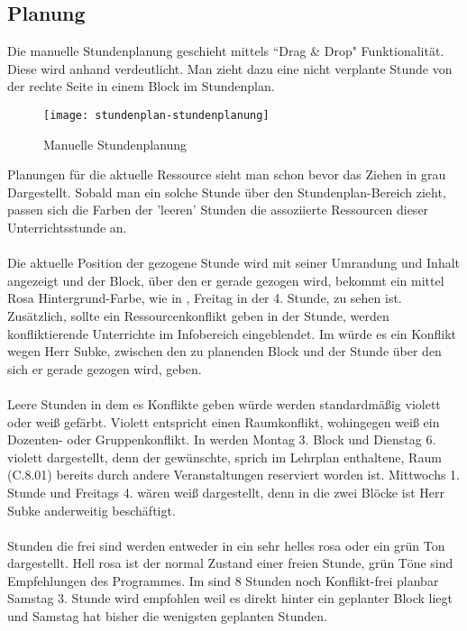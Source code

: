 \subsection{Planung}
\label{sec:manuelle-planung}

Die manuelle Stundenplanung geschieht mittels ``Drag \& Drop" Funktionalität. Diese wird anhand  verdeutlicht. Man zieht dazu eine nicht verplante Stunde von der rechte Seite in einem Block im Stundenplan.\\

\begin{figure}[h]
	\centering
	\texttt{[image: stundenplan-stundenplanung]}
	\vspace{-5pt}
	\caption{Manuelle Stundenplanung}
	\label{fig:stundenplan-stundenplanung}
\end{figure}

\noindent
Planungen für die aktuelle Ressource sieht man schon bevor das Ziehen in grau Dargestellt. Sobald man ein solche Stunde über den Stundenplan-Bereich zieht, passen sich die Farben der 'leeren' Stunden die assoziierte Ressourcen dieser Unterrichtsstunde an.\\
\\
Die aktuelle Position der gezogene Stunde wird mit seiner Umrandung und Inhalt angezeigt und der Block, über den er gerade gezogen wird, bekommt ein mittel Rosa Hintergrund-Farbe, wie in , Freitag in der 4. Stunde, zu sehen ist. Zusätzlich, sollte ein Ressourcenkonflikt geben in der Stunde, werden konfliktierende Unterrichte im Infobereich eingeblendet. Im  würde es ein Konflikt wegen Herr Subke, zwischen den zu planenden Block und der Stunde über den sich er gerade gezogen wird, geben.\\
\\
Leere Stunden in dem es Konflikte geben würde werden standardmäßig violett oder weiß gefärbt. Violett entspricht einen Raumkonflikt, wohingegen weiß ein Dozenten- oder Gruppenkonflikt. In  werden Montag 3. Block und Dienstag 6. violett dargestellt, denn der gewünschte, sprich im Lehrplan enthaltene, Raum (C.8.01) bereits durch andere Veranstaltungen reserviert worden ist. Mittwochs 1. Stunde und Freitags 4. wären weiß dargestellt, denn in die zwei Blöcke ist Herr Subke anderweitig beschäftigt.\\
\\
Stunden die frei sind werden entweder in ein sehr helles rosa oder ein grün Ton dargestellt. Hell rosa ist der normal Zustand einer freien Stunde, grün Töne sind Empfehlungen des Programmes. Im  sind 8 Stunden noch Konflikt-frei planbar Samstag 3. Stunde wird empfohlen weil es direkt hinter ein geplanter Block liegt und Samstag hat bisher die wenigsten geplanten Stunden.

